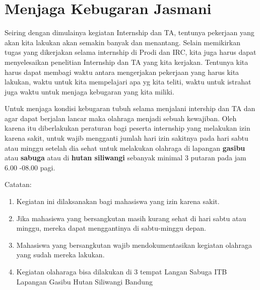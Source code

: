 \section{Menjaga Kebugaran Jasmani}
Seiring dengan dimulainya kegiatan Internship dan TA, tentunya pekerjaan yang akan kita lakukan akan semakin banyak dan menantang. Selain memikirkan tugas yang dikerjakan selama internship di Prodi dan IRC, kita juga harus dapat menyelesaikan penelitian Internship dan TA yang kita kerjakan. Tentunya kita harus dapat membagi waktu antara mengerjakan pekerjaan yang harus kita lakukan, waktu untuk kita mempelajari apa yg kita teliti, waktu untuk istrahat juga waktu untuk menjaga kebugaran yang kita miliki. 

Untuk menjaga kondisi kebugaran tubuh selama menjalani intership dan TA dan agar dapat berjalan lancar maka olahraga menjadi sebuah kewajiban. Oleh karena itu diberlakukan peraturan bagi peserta internship yang melakukan izin karena sakit, untuk wajib mengganti jumlah hari izin sakitnya pada hari sabtu atau minggu setelah dia sehat untuk melakukan olahraga di lapangan \textbf{gasibu} atau \textbf{sabuga} atau di \textbf{hutan siliwangi} sebanyak minimal 3 putaran pada jam 6.00 -08.00 pagi.

Catatan:
\begin{enumerate}
\item Kegiatan ini dilaksanakan bagi mahasiswa yang izin karena sakit.
\item Jika mahasiswa yang bersangkutan masih kurang sehat di hari sabtu atau minggu, mereka dapat menggantinya di sabtu-minggu depan.
\item Mahasiswa yang bersangkutan wajib mendokumentasikan kegiatan olahraga yang sudah mereka lakukan.
\item Kegiatan olaharaga bisa dilakukan di 3 tempat
\subitem Langan Sabuga ITB
\subitem Lapangan Gasibu
\subitem Hutan Siliwangi Bandung 
\end{enumerate} 